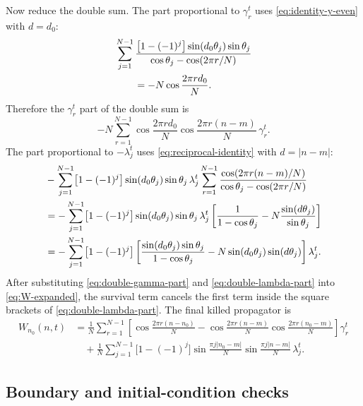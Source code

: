 \documentclass[11pt]{article}
\newcommand{\abs}[1]{\left|#1\right|}
\begin{document}
Now reduce the double sum.  The part proportional to $\gamma_r^t$ uses
\eqref{eq:identity-y-even} with $d=d_0$:
\begin{align}
  &\sum_{j=1}^{N-1}
  \frac{\bigl[1-(-1)^j\bigr]\sin(d_0\theta_j)\sin\theta_j}
  {\cos\theta_j-\cos(2\pi r/N)}\notag\\
  &\qquad =-N\cos\frac{2\pi r d_0}{N}.
\end{align}
Therefore the $\gamma_r^t$ part of the double sum is
\begin{equation}
  -N\sum_{r=1}^{N-1}
  \cos\frac{2\pi r d_0}{N}
  \cos\frac{2\pi r(n-m)}{N}\,\gamma_r^t.
  \label{eq:double-gamma-part}
\end{equation}
The part proportional to $-\lambda_j^t$ uses \eqref{eq:reciprocal-identity} with
$d=\abs{n-m}$:
\begin{align}
  &-\sum_{j=1}^{N-1}\bigl[1-(-1)^j\bigr]\sin(d_0\theta_j)\sin\theta_j\,
  \lambda_j^t
  \sum_{r=1}^{N-1}\frac{\cos(2\pi r(n-m)/N)}
  {\cos\theta_j-\cos(2\pi r/N)}\notag\\
  &=-\sum_{j=1}^{N-1}\bigl[1-(-1)^j\bigr]\sin(d_0\theta_j)\sin\theta_j\,
  \lambda_j^t
  \left[\frac{1}{1-\cos\theta_j}
  -N\frac{\sin(d\theta_j)}{\sin\theta_j}\right]\notag\\
  &=-\sum_{j=1}^{N-1}\bigl[1-(-1)^j\bigr]
  \left[\frac{\sin(d_0\theta_j)\sin\theta_j}{1-\cos\theta_j}
  -N\sin(d_0\theta_j)\sin(d\theta_j)\right]\lambda_j^t.
  \label{eq:double-lambda-part}
\end{align}
After substituting \eqref{eq:double-gamma-part} and \eqref{eq:double-lambda-part} into
\eqref{eq:W-expanded}, the survival term cancels the first term inside the square brackets of
\eqref{eq:double-lambda-part}.  The final killed propagator is
\begin{equation}
  \boxed{\begin{aligned}
  W_{n_0}(n,t)
  &=\frac1N\sum_{r=1}^{N-1}
  \left[
  \cos\frac{2\pi r(n-n_0)}{N}
  -\cos\frac{2\pi r(n-m)}{N}\cos\frac{2\pi r(n_0-m)}{N}
  \right]\gamma_r^t\\
  &\quad+\frac1N\sum_{j=1}^{N-1}\bigl[1-(-1)^j\bigr]
  \sin\frac{\pi j\abs{n_0-m}}{N}
  \sin\frac{\pi j\abs{n-m}}{N}\,\lambda_j^t.
  \end{aligned}}
  \label{eq:W-final}
\end{equation}

\subsection{Boundary and initial-condition checks}
\end{document}

